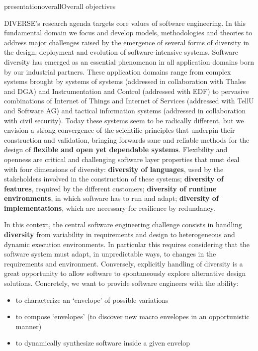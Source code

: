 \documentclass{ra2018}
\newcommand{\team}{DIVERSE}
\begin{document}
\begin{module}{presentation}{overall}{Overall objectives}

  \team{}'s research agenda targets core values of software engineering. 
  In this fundamental domain we focus and develop models, methodologies and theories to address major challenges raised by the emergence of several forms of diversity in the design, deployment and evolution of software-intensive systems.
  Software diversity has emerged as an essential phenomenon in all application domains born by our industrial partners. These application domains range from complex systems brought by systems of systems (addressed in collaboration with Thales and DGA) and Instrumentation and Control (addressed with EDF) to pervasive combinations of Internet of Things and Internet of Services (addressed with TellU and Software AG) and tactical information systems (addressed in collaboration with civil  security).
  Today these systems seem to be radically different, but we envision a strong convergence  of the scientific principles that underpin their construction and validation, bringing forwards sane and reliable methods for the design of  \textbf{flexible and open yet dependable systems}. 
  Flexibility and openness are critical and challenging software layer properties that must deal with four dimensions of diversity: \textbf{diversity of languages}, used by the stakeholders involved in the construction of these systems;  \textbf{diversity of features}, required by the different customers; \textbf{diversity of runtime environments}, in which software has to run and adapt; \textbf{diversity of implementations}, which are necessary for resilience by redundancy.

  In this context, the central software engineering challenge consists in handling \textbf{diversity} from variability in requirements and design to heterogeneous and dynamic execution environments. 
  In particular this requires considering that the software system must adapt, in unpredictable ways, to changes in the requirements and environment. 
  Conversely, explicitly handling of diversity is a great opportunity to allow software to spontaneously explore alternative design solutions. 
  Concretely, we want to provide software engineers with the ability:
  \begin{itemize}
      \item to characterize an `envelope' of possible variations
      \item to compose `envelopes' (to discover new macro envelopes in an opportunistic manner)
      \item to dynamically synthesize software inside a given  envelop
  \end{itemize}


\end{module}
\end{document}
